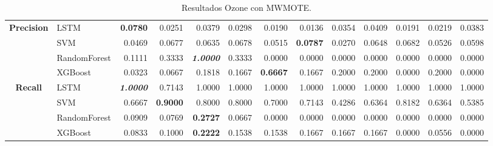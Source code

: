 \begin{table}[H]
\begin{adjustbox}{max width=14cm}
\begin{tabular}{|c|l|r|r|r|r|r|r|r|r|r|r|r|}
			\hline
			\textbf{Precision} &  LSTM & \textbf{  0.0780 } &  0.0251 &  0.0379 &  0.0298 &  0.0190 &  0.0136 &  0.0354 &  0.0409 &  0.0191 &  0.0219 &  0.0383 \\
			&  SVM &  0.0469 &  0.0677 &  0.0635 &  0.0678 &  0.0515 & \textbf{  0.0787 } &  0.0270 &  0.0648 &  0.0682 &  0.0526 &  0.0598 \\
			&  RandomForest &  0.1111 &  0.3333 & \textit{ \textbf{  1.0000 } } &  0.3333 &  0.0000 &  0.0000 &  0.0000 &  0.0000 &  0.0000 &  0.0000 &  0.0000 \\
			&  XGBoost &  0.0323 &  0.0667 &  0.1818 &  0.1667 & \textbf{  0.6667 } &  0.1667 &  0.2000 &  0.2000 &  0.0000 &  0.2000 &  0.0000 \\
			\hline
			\textbf{Recall} &  LSTM & \textit{ \textbf{  1.0000 } } &  0.7143 &  1.0000 &  1.0000 &  1.0000 &  1.0000 &  1.0000 &  1.0000 &  1.0000 &  1.0000 &  1.0000 \\
			&  SVM &  0.6667 & \textbf{  0.9000 } &  0.8000 &  0.8000 &  0.7000 &  0.7143 &  0.4286 &  0.6364 &  0.8182 &  0.6364 &  0.5385 \\
			&  RandomForest &  0.0909 &  0.0769 & \textbf{  0.2727 } &  0.0667 &  0.0000 &  0.0000 &  0.0000 &  0.0000 &  0.0000 &  0.0000 &  0.0000 \\
			&  XGBoost &  0.0833 &  0.1000 & \textbf{  0.2222 } &  0.1538 &  0.1538 &  0.1667 &  0.1667 &  0.1667 &  0.0000 &  0.0556 &  0.0000 \\
			\hline
		\end{tabular}
	\end{adjustbox}
	\caption{Resultados Ozone con MWMOTE.}
	\label{tab:Ozone_MWMOTE}
\end{table}

